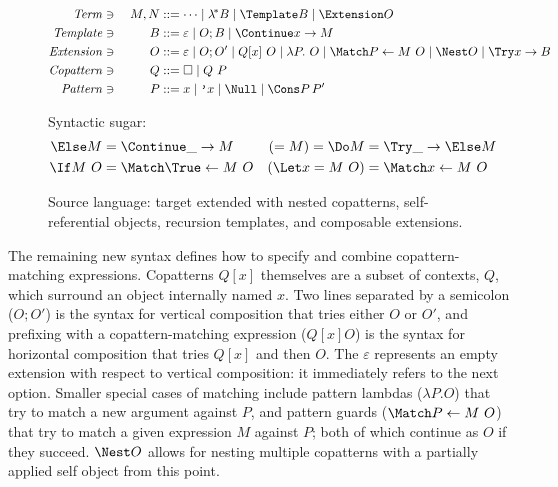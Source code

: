 \begin{figure}[t]
\centering
\small
\begin{alignat*}{2}
  \mathit{Term} &\ni{}& M, N
  &::= \dots
  \mid \lamstar B
  \mid \Template B
  \mid \Extension O
  \\
  \mathit{Template} &\ni{}& B
  &::= \varepsilon
  \mid O; B
  \mid \Continue x \to M
  \\
  \mathit{Extension} &\ni{}& O
  &::= \varepsilon
  \mid O; O'
  \mid Q[x] ~ O
  \mid \lambda P.~ O
  \mid \Match P \gets M ~ O
  \mid \Nest O
  \mid \Try x \to B
  \\
  \mathit{Copattern} &\ni{}& Q
  &::= \hole
  \mid Q ~ P
  \\
  \mathit{Pattern} &\ni{}& P
  &::= x
  \mid \q{x}
  \mid \Null
  \mid \Cons P \, P'
\end{alignat*}

Syntactic sugar:
\begin{align*}
  \Else M
  &=
  \Continue \_ \to M
  &
  (= M)
  =
  \Do M
  &=
  \Try \_ \to \Else M
  \\
  \If M ~ O
  &=
  \Match \True \gets M ~ O
  &
  (\Let x = M ~ O)
  &=
  \Match x \gets M ~ O
\end{align*}
\caption{Source language: target extended with nested copatterns,
  self-referential objects, recursion templates, and composable extensions.}
\label{fig:source-syntax}
\end{figure}

The remaining new syntax defines how to specify and combine copattern-matching expressions.
Copatterns $Q[x]$ themselves are a subset of contexts, $Q$, which surround an object internally named $x$.
Two lines separated by a semicolon ($O; O'$) is the syntax for vertical composition that tries either $O$ or $O'$, and prefixing with a copattern-matching expression ($Q[x] O$) is the syntax for horizontal composition that tries $Q[x]$ and then $O$.
The $\varepsilon$ represents an empty extension with respect to vertical composition: it immediately refers to the next option.
Smaller special cases of matching include pattern lambdas ($\lambda P. O$) that try to match a new argument against $P$, and pattern guards ($\Match P \gets M ~ O$) that try to match a given expression $M$ against $P$; both of which continue as $O$ if they succeed.
$\Nest O$ allows for nesting multiple copatterns with a partially applied self object from this point.

